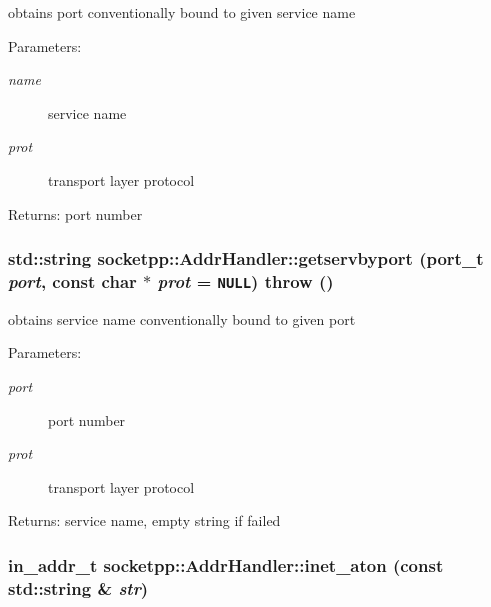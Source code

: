 obtains port conventionally bound to given service name 

\begin{Desc}
\item[Parameters:]
\begin{description}
\item[{\em name}]service name \item[{\em prot}]transport layer protocol \end{description}
\end{Desc}
\begin{Desc}
\item[Returns:]port number \end{Desc}
\hypertarget{classsocketpp_1_1AddrHandler_f221cac56bf3808494806d335a56bb87}{
\subsubsection[{getservbyport}]{\setlength{\rightskip}{0pt plus 5cm}std::string socketpp::AddrHandler::getservbyport ({\bf port\_\-t} {\em port}, \/  const char $\ast$ {\em prot} = {\tt NULL})  throw ()}}
\label{classsocketpp_1_1AddrHandler_f221cac56bf3808494806d335a56bb87}


obtains service name conventionally bound to given port 

\begin{Desc}
\item[Parameters:]
\begin{description}
\item[{\em port}]port number \item[{\em prot}]transport layer protocol \end{description}
\end{Desc}
\begin{Desc}
\item[Returns:]service name, empty string if failed \end{Desc}
\hypertarget{classsocketpp_1_1AddrHandler_e2eda37cd4c20059c557e4e65c829cf8}{
\subsubsection[{inet\_\-aton}]{\setlength{\rightskip}{0pt plus 5cm}in\_\-addr\_\-t socketpp::AddrHandler::inet\_\-aton (const std::string \& {\em str})}}
\label{classsocketpp_1_1AddrHandler_e2eda37cd4c20059c557e4e65c829cf8}


